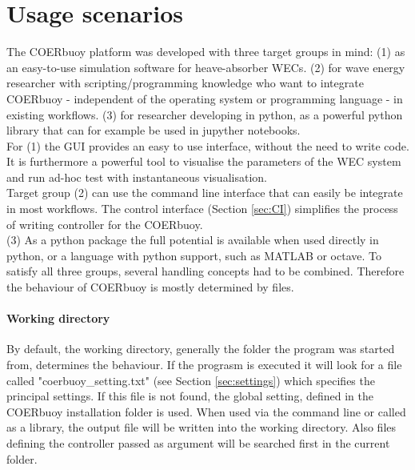 \documentclass[oneside,10pt,a4paper]{book}
\begin{document}
\section{Usage scenarios}
The COERbuoy platform was developed with three target groups in mind: (1) as an easy-to-use simulation software for heave-absorber WECs. (2) for wave energy researcher with scripting/programming knowledge who want to integrate COERbuoy - independent of the operating system or programming language - in existing workflows. (3) for researcher developing in python, as a powerful python library that can for example be used in jupyther notebooks.\\
For (1) the GUI provides an easy to use interface, without the need to write code. It is furthermore a powerful tool to visualise the parameters of the WEC system and run ad-hoc test with instantaneous visualisation.\\
Target group (2) can use the command line interface that can easily be integrate in most workflows. The control interface (Section \ref{sec:CI}) simplifies the process of writing controller for the COERbuoy.\\
(3) As a python package the full potential is available when used directly in python, or a language with python support, such as MATLAB or octave.
To satisfy all three groups, several handling concepts had to be combined. Therefore the behaviour of COERbuoy is mostly determined by files.
\paragraph{Working directory}
By default, the working directory, generally the folder the program was started from, determines the behaviour. If the prograsm is executed it will look for a file called "coerbuoy\_setting.txt" (see Section \ref{sec:settings}) which specifies the principal settings. If this file is not found, the global setting, defined in the COERbuoy installation folder is used.
When used via the command line or called as a library, the output file will be written into the working directory. Also files defining the controller passed as argument will be searched first in the current folder.\\
\end{document}
